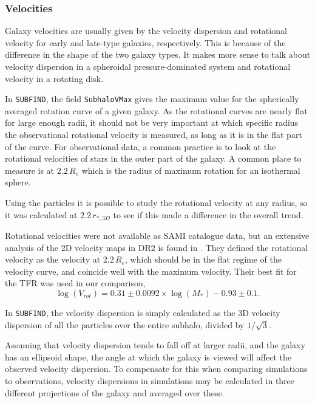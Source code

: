 \subsubsection{Velocities}

Galaxy velocities are usually given by the velocity dispersion and rotational velocity for early and late-type galaxies, respectively. This is because of the difference in the shape of the two galaxy types. It makes more sense to talk about velocity dispersion in a spheroidal pressure-dominated system and rotational velocity in a rotating disk.

In \texttt{SUBFIND}, the field \texttt{SubhaloVMax} gives the maximum value for the spherically averaged rotation curve of a given galaxy. As the rotational curves are nearly flat for large enough radii, it should not be very important at which specific radius the observational rotational velocity is measured, as long as it is in the flat part of the curve. For observational data, a common practice is to look at the rotational velocities of stars in the outer part of the galaxy. A common place to measure is at $2.2\, R_e$ which is the radius of maximum rotation for an isothermal sphere.

Using the particles it is possible to study the rotational velocity at any radius, so it was calculated at $2.2\, r_{\ast, 3D}$ to see if this made a difference in the overall trend.

Rotational velocities were not available as SAMI catalogue data, but an extensive analysis of the 2D velocity maps in DR2 is found in \textcite{Bloom2017}. They defined the rotational velocity as the velocity at $2.2\, R_e$, which should be in the flat regime of the velocity curve, and coincide well with the maximum velocity. Their best fit for the TFR was used in our comparison, 
\begin{equation}
	\log(V_{rot}) = 0.31 \pm 0.0092 \times \log(M_*)-0.93 \pm 0.1.
\end{equation}


In \texttt{SUBFIND}, the velocity dispersion is simply calculated as the 3D velocity dispersion of all the particles over the entire subhalo, divided by $1/\sqrt{3}$.

Assuming that velocity dispersion tends to fall off at larger radii, and the galaxy has an ellipsoid shape, the angle at which the galaxy is viewed will affect the observed velocity dispersion. To compensate for this when comparing simulations to observations, velocity dispersions in simulations may be calculated in three different projections of the galaxy and averaged over these. 

